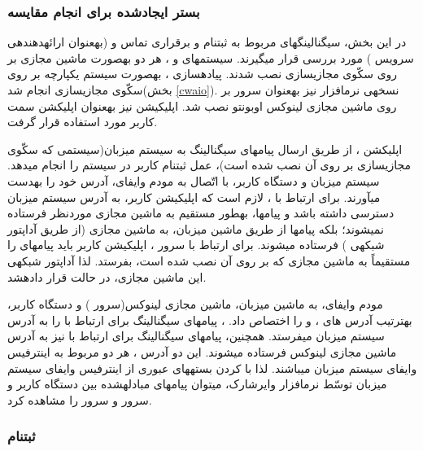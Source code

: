 \subsubsection{بستر ایجادشده برای انجام مقایسه}
در این بخش، سیگنالینگ\nf های مربوط به ثبت\nf نام و برقراری تماس  و (به\nf عنوان ارائه\nf دهنده\nf ی سرویس ) مورد بررسی قرار می\nf گیرند. سیستم\nf های  و ، هر دو به\nf صورت ماشین مجازی بر روی سکّوی مجازی\nf سازی  نصب شدند. پیاده\nf سازی ، به\nf صورت سیستم یکپارچه بر روی سکّوی مجازی\nf سازی انجام شد(بخش \ref{cwaio}). نسخه\nf ی  نرم\nf افزار \cite{asterisk} نیز به\nf عنوان سرور  بر روی ماشین مجازی لینوکس اوبونتو  نصب شد. اپلیکیشن  نیز به\nf عنوان اپلیکشن سمت کاربر مورد استفاده قرار گرفت. 

اپلیکشن ، از طریق ارسال پیام\nf های سیگنالینگ به سیستم میزبان(سیستمی که سکّوی مجازی\nf سازی بر روی آن نصب شده است)، عمل ثبت\nf نام کاربر در سیستم را انجام می\nf دهد. سیستم میزبان و دستگاه کاربر، با اتّصال به مودم وای\nf فای، آدرس  خود را به\nf دست می\nf آورند. برای ارتباط با ، لازم است که اپلیکیشن کاربر، به آدرس  سیستم میزبان دسترسی داشته باشد و پیام\nf ها، به\nf طور مستقیم به ماشین مجازی موردنظر فرستاده نمی\nf شوند؛ بلکه پیام\nf ها از طریق ماشین میزبان، به ماشین مجازی (از طریق آداپتور شبکه\nf ی ) فرستاده می\nf شوند. برای ارتباط با سرور ، اپلیکیشن کاربر باید پیام\nf های  را مستقیماً به ماشین مجازی که  بر روی آن نصب شده است، بفرستد. لذا آداپتور شبکه\nf ی این ماشین مجازی، در حالت  قرار داده\nf شد.

مودم وای\nf فای، به ماشین میزبان، ماشین مجازی لینوکس(سرور ) و دستگاه کاربر، به\nf ترتیب آدرس  های ،  و  را اختصاص داد. ، پیام\nf های سیگنالینگ برای ارتباط با  را به آدرس  سیستم میزبان می\nf فرستد. همچنین، پیام\nf های سیگنالینگ برای ارتباط با  نیز به آدرس  ماشین مجازی لینوکس فرستاده میشوند. این دو آدرس ، هر دو مربوط به اینترفیس وای\nf فای سیستم میزبان می\nf باشند. لذا با  کردن بسته\nf های عبوری از اینترفیس وای\nf فای سیستم میزبان توسّط نرم\nf افزار وایرشارک، می\nf توان پیام\nf های  مبادله\nf شده بین دستگاه کاربر و سرور  و سرور  را مشاهده کرد. 

\subsubsection{ثبت\nf نام  }

